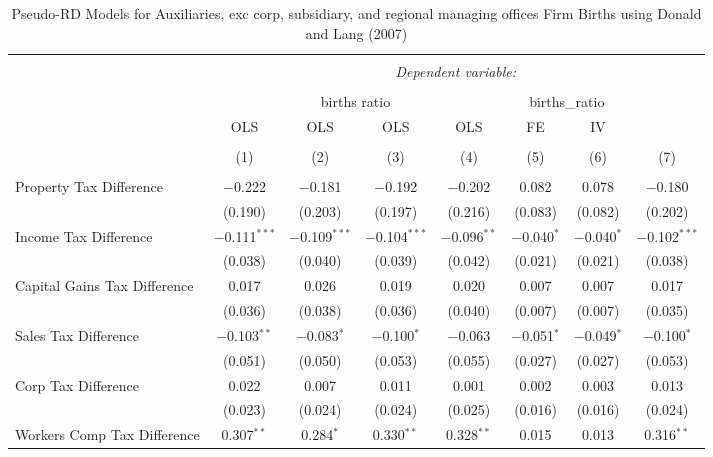 
\begin{table}[!htbp] \centering 
  \caption{Pseudo-RD Models for  Auxiliaries, exc corp, subsidiary, and regional managing offices Firm Births using Donald and Lang (2007)} 
  \label{} 
\begin{tabular}{@{\extracolsep{5pt}}lccccccc} 
\\[-1.8ex]\hline 
\hline \\[-1.8ex] 
 & \multicolumn{7}{c}{\textit{Dependent variable:}} \\ 
\cline{2-8} 
\\[-1.8ex] & \multicolumn{4}{c}{births ratio} & \multicolumn{2}{c}{births\_ratio} &   \\ 
 & OLS & OLS & OLS & OLS & FE & IV &  \\ 
\\[-1.8ex] & (1) & (2) & (3) & (4) & (5) & (6) & (7)\\ 
\hline \\[-1.8ex] 
 Property Tax Difference & $-$0.222 & $-$0.181 & $-$0.192 & $-$0.202 & 0.082 & 0.078 & $-$0.180 \\ 
  & (0.190) & (0.203) & (0.197) & (0.216) & (0.083) & (0.082) & (0.202) \\ 
  Income Tax Difference & $-$0.111$^{***}$ & $-$0.109$^{***}$ & $-$0.104$^{***}$ & $-$0.096$^{**}$ & $-$0.040$^{*}$ & $-$0.040$^{*}$ & $-$0.102$^{***}$ \\ 
  & (0.038) & (0.040) & (0.039) & (0.042) & (0.021) & (0.021) & (0.038) \\ 
  Capital Gains Tax Difference & 0.017 & 0.026 & 0.019 & 0.020 & 0.007 & 0.007 & 0.017 \\ 
  & (0.036) & (0.038) & (0.036) & (0.040) & (0.007) & (0.007) & (0.035) \\ 
  Sales Tax Difference & $-$0.103$^{**}$ & $-$0.083$^{*}$ & $-$0.100$^{*}$ & $-$0.063 & $-$0.051$^{*}$ & $-$0.049$^{*}$ & $-$0.100$^{*}$ \\ 
  & (0.051) & (0.050) & (0.053) & (0.055) & (0.027) & (0.027) & (0.053) \\ 
  Corp Tax Difference & 0.022 & 0.007 & 0.011 & 0.001 & 0.002 & 0.003 & 0.013 \\ 
  & (0.023) & (0.024) & (0.024) & (0.025) & (0.016) & (0.016) & (0.024) \\ 
  Workers Comp Tax Difference & 0.307$^{**}$ & 0.284$^{*}$ & 0.330$^{**}$ & 0.328$^{**}$ & 0.015 & 0.013 & 0.316$^{**}$ \\ 

\end{tabular}
\end{table}
